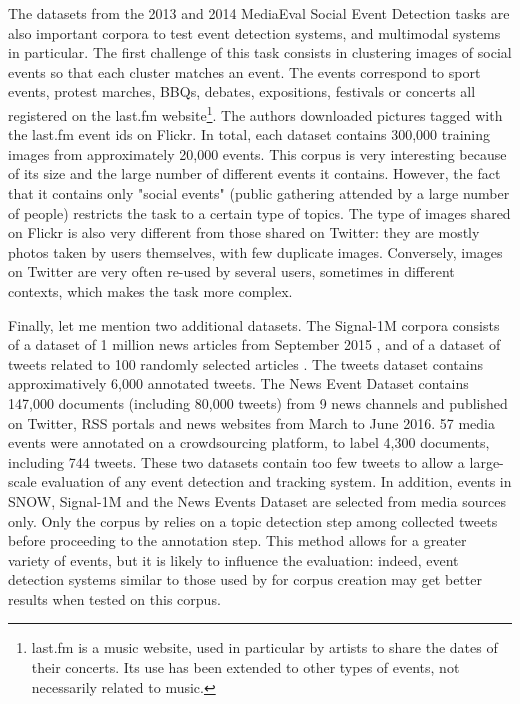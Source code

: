 The datasets from the 2013 and 2014 MediaEval Social Event Detection tasks \cite{reuter2013social, petkos2014social} are
also important corpora to test event detection systems, and multimodal systems in particular. The first challenge of
this task consists in clustering images of social events so that each cluster matches an event. The events correspond to
sport events, protest marches, BBQs, debates, expositions, festivals or concerts all registered on the last.fm
website\footnote{last.fm is a music website, used in particular by artists to share the dates of their concerts.
Its use has been extended to other types of events, not necessarily related to music.}.
The authors downloaded pictures tagged with the last.fm event ids on Flickr. In total, each dataset contains 300,000 training images from approximately 20,000 events. This corpus is very interesting because of its size and the large number of different events it contains. However, the fact that it contains only "social events" (public gathering attended by a large number of people) restricts the task to a certain type of topics. The type of images shared on Flickr is also very different from those shared on Twitter: they are mostly photos taken by users themselves, with few duplicate images. Conversely, images on Twitter are very often re-used by several users, sometimes in different contexts, which makes the task more complex.

Finally, let me mention two additional datasets. The Signal-1M corpora consists of a dataset of 1 million news articles from September 2015 \citep{corney2016million}, and of a dataset of tweets related to 100 randomly selected articles \citep{suarez2018data}. The tweets dataset contains approximatively 6,000 annotated tweets. The News Event Dataset \citep{mele2019multi} contains 147,000 documents (including 80,000 tweets) from 9 news channels and published on Twitter, RSS portals and news websites from March to June 2016. 57 media events were annotated on a crowdsourcing platform, to label 4,300 documents, including 744 tweets. These two datasets contain too few tweets to allow a large-scale evaluation of any event detection and tracking system. In addition, events in SNOW, Signal-1M and the News Events Dataset are selected from media sources only. Only the corpus by \citet{mcminn_building_2013} relies on a topic detection step among collected tweets before proceeding to the annotation step. This method allows for a greater variety of events, but it is likely to influence the evaluation: indeed, event detection systems similar to those used by \citet{mcminn_building_2013} for corpus creation may get better results when tested on this corpus.

